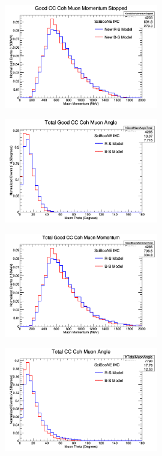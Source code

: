 \documentclass[11pt]{article}
\begin{document}
\begin{figure}[H]
\centering
\includegraphics[width=0.6\textwidth]{ANMCombinedPlotsImages/10-ANMCombinedPlots.png}
\caption{}
\end{figure}

\begin{figure}[H]
\centering
\includegraphics[width=0.6\textwidth]{ANMCombinedPlotsImages/11-ANMCombinedPlots.png}
\caption{}
\end{figure}

\begin{figure}[H]
\centering
\includegraphics[width=0.6\textwidth]{ANMCombinedPlotsImages/12-ANMCombinedPlots.png}
\caption{}
\end{figure}

\begin{figure}[H]
\centering
\includegraphics[width=0.6\textwidth]{ANMCombinedPlotsImages/13-ANMCombinedPlots.png}
\caption{}
\end{figure}
\end{document}
